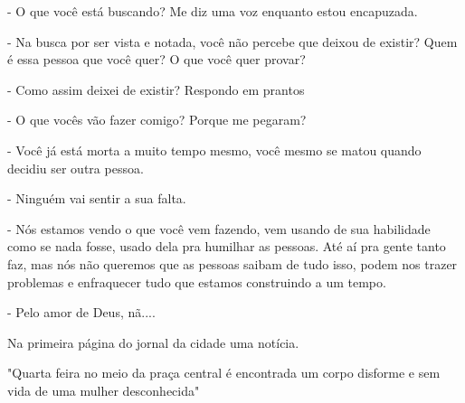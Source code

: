 - O que você está buscando? Me diz uma voz enquanto estou encapuzada. 

- Na busca por ser vista e notada, você não percebe que deixou de existir? Quem é essa pessoa que você quer? O que você quer provar?

- Como assim deixei de existir? Respondo em prantos

- O que vocês vão fazer comigo? Porque me pegaram?

- Você já está morta a muito tempo mesmo, você mesmo se matou quando decidiu ser outra pessoa.

- Ninguém vai sentir a sua falta.

- Nós estamos vendo o que você vem fazendo, vem usando de sua habilidade como se nada fosse, usado dela pra humilhar as pessoas. Até aí pra gente tanto faz, mas nós não queremos que as pessoas saibam de tudo isso, podem nos trazer problemas e enfraquecer tudo que estamos construindo a um tempo.

- Pelo amor de Deus, nã....

Na primeira página do jornal da cidade uma notícia.

"Quarta feira no meio da praça central é encontrada um corpo disforme e sem vida de uma mulher desconhecida"


